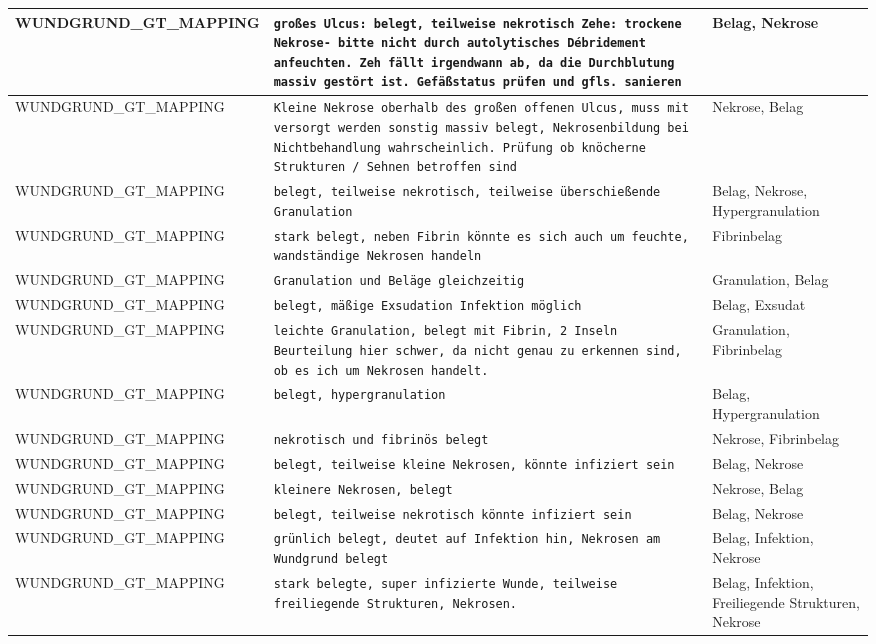 \begin{longtable}{|p{3.5cm}|p{5cm}|p{6.5cm}|}
WUNDGRUND\_GT\_MAPPING & \texttt{großes Ulcus: belegt, teilweise nekrotisch
Zehe: trockene Nekrose- bitte nicht durch autolytisches Débridement anfeuchten. Zeh fällt irgendwann ab, da die Durchblutung massiv gestört ist. Gefäßstatus prüfen und gfls. sanieren} & Belag, Nekrose \\ \hline
WUNDGRUND\_GT\_MAPPING & \texttt{Kleine Nekrose oberhalb des großen offenen Ulcus, muss mit versorgt werden
sonstig massiv belegt, Nekrosenbildung bei Nichtbehandlung wahrscheinlich. Prüfung ob knöcherne Strukturen / Sehnen betroffen sind} & Nekrose, Belag \\ \hline
WUNDGRUND\_GT\_MAPPING & \texttt{belegt, teilweise nekrotisch, teilweise überschießende Granulation} & Belag, Nekrose, Hypergranulation \\ \hline
WUNDGRUND\_GT\_MAPPING & \texttt{stark belegt, neben Fibrin könnte es sich auch um feuchte, wandständige Nekrosen handeln} & Fibrinbelag \\ \hline
WUNDGRUND\_GT\_MAPPING & \texttt{Granulation und Beläge gleichzeitig} & Granulation, Belag \\ \hline
WUNDGRUND\_GT\_MAPPING & \texttt{belegt, mäßige Exsudation Infektion möglich} & Belag, Exsudat \\ \hline
WUNDGRUND\_GT\_MAPPING & \texttt{leichte Granulation, belegt mit Fibrin, 2 Inseln Beurteilung hier schwer, da nicht genau zu erkennen sind, ob es ich um Nekrosen handelt.} & Granulation, Fibrinbelag \\ \hline
WUNDGRUND\_GT\_MAPPING & \texttt{belegt, hypergranulation} & Belag, Hypergranulation \\ \hline
WUNDGRUND\_GT\_MAPPING & \texttt{nekrotisch und fibrinös belegt} & Nekrose, Fibrinbelag \\ \hline
WUNDGRUND\_GT\_MAPPING & \texttt{belegt, teilweise kleine Nekrosen, könnte infiziert sein} & Belag, Nekrose \\ \hline
WUNDGRUND\_GT\_MAPPING & \texttt{kleinere Nekrosen, belegt} & Nekrose, Belag \\ \hline
WUNDGRUND\_GT\_MAPPING & \texttt{belegt, teilweise nekrotisch könnte infiziert sein} & Belag, Nekrose \\ \hline
WUNDGRUND\_GT\_MAPPING & \texttt{grünlich belegt, deutet auf Infektion hin, Nekrosen am  Wundgrund belegt} & Belag, Infektion, Nekrose \\ \hline
WUNDGRUND\_GT\_MAPPING & \texttt{stark belegte, super infizierte Wunde, teilweise freiliegende Strukturen,
Nekrosen.} & Belag, Infektion, Freiliegende Strukturen, Nekrose \\ \hline

\end{longtable}
